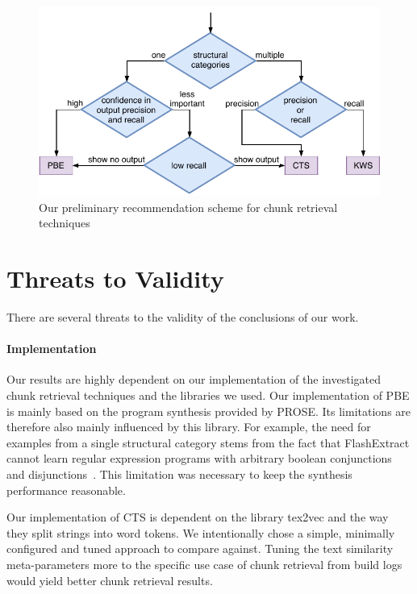 \documentclass[\myrootdir/main.tex]{subfiles}
\begin{document}
\begin{figure}[htbp]
		\centering
		\includegraphics[width=\textwidth, clip]{img/crt-recommendation.pdf}
		\caption{Our preliminary recommendation scheme for chunk retrieval techniques}
		\label{fig:crt-recommendation}
\end{figure}

\section{Threats to Validity}

There are several threats to the validity of the conclusions of our work.

\paragraph{Implementation}
Our results are highly dependent on our implementation of the investigated chunk retrieval techniques and the libraries we used.
Our implementation of PBE is mainly based on the program synthesis provided by PROSE\@.
Its limitations are therefore also mainly influenced by this library.
For example, the need for examples from a single structural category stems from the fact that FlashExtract cannot learn regular expression programs with arbitrary boolean conjunctions and disjunctions~\cite{mayer2015user}.
This limitation was necessary to keep the synthesis performance reasonable.

Our implementation of CTS is dependent on the library tex2vec and the way they split strings into word tokens.
We intentionally chose a simple, minimally configured and tuned approach to compare against.
Tuning the text similarity meta-parameters more to the specific use case of chunk retrieval from build logs would yield better chunk retrieval results.
\end{document}
